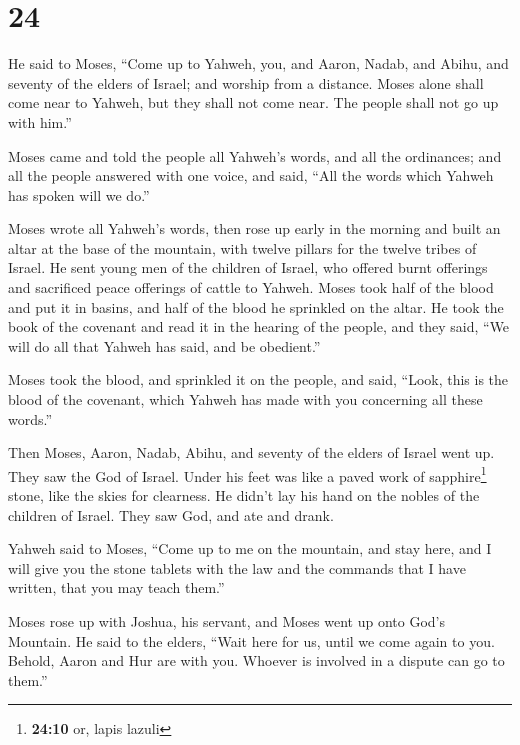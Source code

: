 \hypertarget{section-23}{%
\section{24}\label{section-23}}

 He said to Moses, ``Come up to Yahweh, you, and Aaron,
Nadab, and Abihu, and seventy of the elders of Israel; and worship from
a distance.  Moses alone shall come near to Yahweh, but
they shall not come near. The people shall not go up with him.''

 Moses came and told the people all Yahweh's words, and
all the ordinances; and all the people answered with one voice, and
said, ``All the words which Yahweh has spoken will we do.''

 Moses wrote all Yahweh's words, then rose up early in the
morning and built an altar at the base of the mountain, with twelve
pillars for the twelve tribes of Israel.  He sent young
men of the children of Israel, who offered burnt offerings and
sacrificed peace offerings of cattle to Yahweh.  Moses
took half of the blood and put it in basins, and half of the blood he
sprinkled on the altar.  He took the book of the covenant
and read it in the hearing of the people, and they said, ``We will do
all that Yahweh has said, and be obedient.''

 Moses took the blood, and sprinkled it on the people, and
said, ``Look, this is the blood of the covenant, which Yahweh has made
with you concerning all these words.''

 Then Moses, Aaron, Nadab, Abihu, and seventy of the
elders of Israel went up.  They saw the God of Israel.
Under his feet was like a paved work of sapphire\footnote{\textbf{24:10}
  or, lapis lazuli} stone, like the skies for clearness. 
He didn't lay his hand on the nobles of the children of Israel. They saw
God, and ate and drank.

 Yahweh said to Moses, ``Come up to me on the mountain,
and stay here, and I will give you the stone tablets with the law and
the commands that I have written, that you may teach them.''

 Moses rose up with Joshua, his servant, and Moses went
up onto God's Mountain.  He said to the elders, ``Wait
here for us, until we come again to you. Behold, Aaron and Hur are with
you. Whoever is involved in a dispute can go to them.''

